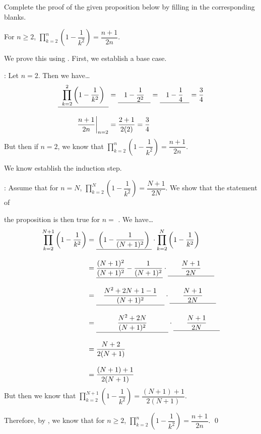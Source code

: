 \documentclass[11pt,letterpaper]{article}
\begin{document}
 Complete the proof of the given proposition below by filling in the corresponding blanks. \pspace

 For $n \geq 2$, $\displaystyle\prod_{k=2}^n \left(1 - \dfrac{1}{k^2} \right)= \dfrac{n + 1}{2n}$. \pspace

 We prove this using . First, we establish a base case. \pspace

: Let $n= 2$. Then we have\dots
	\[
	\begin{aligned}
	\uans{0.2cm}{\prod_{k=2}^2 \left(1 - \frac{1}{k^2} \right)}&= \uans{0.3cm}{1 - \frac{1}{2^2}}= \uans{0.3cm}{1 - \frac{1}{4}}= \dfrac{3}{4} \\[0.3cm]
	\dfrac{n + 1}{2n} \bigg|_{n= 2}&= \dfrac{2 + 1}{2(2)}= \dfrac{3}{4}
	\end{aligned}
	\]
But then if $n= 2$, we know that $\displaystyle\prod_{k=2}^n \left(1 - \dfrac{1}{k^2} \right)= \dfrac{n + 1}{2n}$. 

We know establish the induction step. 

: Assume that for $n= N$, $\displaystyle\prod_{k=2}^N \left(1 - \dfrac{1}{k^2} \right)= \dfrac{N + 1}{2N}$. We show that the statement of \pspace 

the proposition is then true for $n=$ . We have\dots \pspace
	\[
	\begin{aligned}
	\prod_{k=2}^{N+1} \left(1 - \dfrac{1}{k^2} \right)&= \uans{0.1cm}{\left(1 - \dfrac{1}{(N + 1)^2} \right)} \cdot \prod_{k=2}^N \left(1 - \dfrac{1}{k^2} \right) \\[0.3cm]
	&= \uans{0cm}{\dfrac{(N + 1)^2}{(N + 1)^2} - \dfrac{1}{(N + 1)^2}} \cdot \uans{0.65cm}{\dfrac{N + 1}{2N}} \\[0.3cm]
	&= \uans{0.35cm}{\dfrac{N^2 + 2N + 1 - 1}{(N + 1)^2}} \cdot \uans{0.65cm}{\dfrac{N + 1}{2N}} \\[0.3cm]
	&= \uans{1.05cm}{\dfrac{N^2 + 2N}{(N + 1)^2}} \cdot \uans{0.65cm}{\dfrac{N + 1}{2N}} \\[0.3cm]
	&= \dfrac{N + 2}{2(N + 1)} \\[0.3cm]
	&= \dfrac{(N + 1) + 1}{2(N + 1)}
	\end{aligned}
	\]
But then we know that $\displaystyle\prod_{k=2}^{N+1} \left(1 - \dfrac{1}{k^2} \right)= \dfrac{(N + 1) + 1}{2(N + 1)}$. 

Therefore, by , we know that for $n \geq 2$, $\displaystyle\prod_{k=2}^n \left(1 - \dfrac{1}{k^2} \right)= \dfrac{n + 1}{2n}$. \qed
\end{document}
